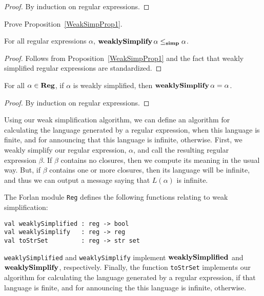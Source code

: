 \begin{proof}
By induction on regular expressions.
\end{proof}

\begin{exercise}
\label{WeakSimpExercise}
Prove Proposition~\ref{WeakSimpProp1}.
\end{exercise}

\begin{corollary}
\label{WeakSimpProp1Cor}
For all regular expressions $\alpha$,
$\mathbf{weaklySimplify}\,\alpha \mathrel{\leq_{\mathbf{simp}}} \alpha$.
\end{corollary}

\begin{proof}
Follows from Proposition~\ref{WeakSimpProp1} and the fact
that weakly simplified regular expressions are standardized.
\end{proof}

\begin{proposition}
\label{WeakSimpProp5}
For all $\alpha\in\mathbf{Reg}$, if $\alpha$ is weakly simplified, then
$\mathbf{weaklySimplify}\,\alpha = \alpha$.
\end{proposition}

\begin{proof}
By induction on regular expressions.
\end{proof}

Using our weak simplification algorithm, we can define an algorithm
for calculating the language generated by a regular expression, when
this language is finite, and for announcing that this language is
infinite, otherwise.  First, we weakly simplify our regular
expression, $\alpha$, and call the resulting regular expression
$\beta$.  If $\beta$ contains no closures, then we compute its meaning
in the usual way.  But, if $\beta$ contains one or more closures, then
its language will be infinite, and thus we can output a message saying
that $L(\alpha)$ is infinite.

The Forlan module \texttt{Reg} defines the following functions relating
to weak simplification:
\begin{verbatim}
val weaklySimplified : reg -> bool
val weaklySimplify   : reg -> reg
val toStrSet         : reg -> str set
\end{verbatim}
%
%
%
\texttt{weaklySimplified} and \texttt{weaklySimplify}
implement $\mathbf{weaklySimplified}$ and $\mathbf{weaklySimplify}$,
respectively. Finally, the function \texttt{toStrSet} implements our
algorithm for calculating the language generated by a regular
expression, if that language is finite, and for announcing the this
language is infinite, otherwise.


